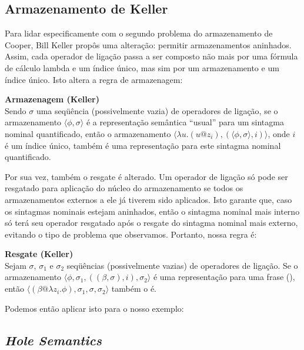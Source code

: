 
\subsection{Armazenamento de Keller}
Para lidar especificamente com o segundo problema do armazenamento de Cooper, Bill Keller propôs uma alteração: permitir armazenamentos aninhados. Assim, cada operador de ligação passa a ser composto não mais por uma fórmula de cálculo lambda e um índice único, mas sim por um armazenamento e um índice único. Isto altera a regra de armazenagem:

\begin{oframed}\textbf{Armazenagem (Keller)}\\
Sendo $\sigma$ uma seqüência (possivelmente vazia) de operadores de ligação, se o armazenamento $\langle\phi, \sigma\rangle$ é a representação semântica ``usual'' para um sintagma nominal quantificado, então o armazenamento $\langle\lambda u.(u@z_i), (\langle \phi, \sigma \rangle, i) \rangle $, onde $i$ é um índice único, também é uma representação para este sintagma nominal quantificado.
\end{oframed}

Por sua vez, também o resgate é alterado. Um operador de ligação só pode ser resgatado para aplicação do núcleo do armazenamento se todos os armazenamentos externos a ele já tiverem sido aplicados. Isto garante que, caso os sintagmas nominais estejam aninhados, então o sintagma nominal mais interno só terá seu operador resgatado após o resgate do sintagma nominal mais externo, evitando o tipo de problema que observamos. Portanto, nossa regra é:

\begin{oframed}\textbf{Resgate (Keller)}\\
Sejam $\sigma$, $\sigma_1$ e $\sigma_2$ seqüências (possivelmente vazias) de operadores de ligação. Se o armazenamento $\langle \phi, \sigma_1, ((\beta, \sigma), i), \sigma_2 \rangle$ é uma representação para uma frase (), então $\langle (\beta @ \lambda z_i . \phi ), \sigma_1, \sigma, \sigma_2 \rangle$ também o é.
\end{oframed}

Podemos então aplicar isto para o nosso exemplo:



\subsection{\textit{Hole Semantics}}
